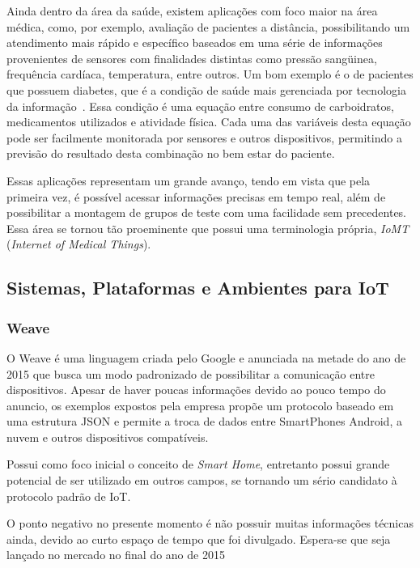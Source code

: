 Ainda dentro da área da saúde, existem aplicações com foco maior na área médica, como, por exemplo,
avaliação de pacientes a distância, possibilitando um atendimento mais rápido e específico baseados em uma
série de informações provenientes de sensores com finalidades distintas como pressão sangüinea,
frequência cardíaca, temperatura, entre outros. Um bom exemplo é o de pacientes que possuem
diabetes, que é a condição de saúde mais gerenciada por tecnologia da informação~\cite{mcgrath2013sensor}.
Essa condição é uma equação entre consumo de carboidratos, medicamentos utilizados e atividade física.
Cada uma das variáveis desta equação pode ser facilmente monitorada por sensores e outros dispositivos,
permitindo a previsão do resultado desta combinação no bem estar do paciente.

Essas aplicações representam um grande avanço, tendo em vista que pela primeira vez, é possível
acessar informações precisas em tempo real, além de possibilitar a montagem de grupos de teste com
uma facilidade sem precedentes. Essa área se tornou tão proeminente que
possui uma terminologia própria, \textit{IoMT} (\textit{Internet of Medical Things}).


\subsection{Sistemas, Plataformas e Ambientes para IoT}
\label{sec:IoTPlataformas}

\subsubsection{Weave}
O Weave é uma linguagem criada pelo Google e anunciada na metade do ano de 2015 que busca um modo padronizado
de possibilitar a comunicação entre dispositivos. Apesar de haver poucas informações devido ao pouco tempo
do anuncio, os exemplos expostos pela empresa propõe um protocolo baseado em uma estrutura JSON e permite a troca
de dados entre SmartPhones Android, a nuvem e outros dispositivos compatíveis.

Possui como foco inicial o conceito de \textit{Smart Home}, entretanto possui grande potencial de
ser utilizado em outros campos, se tornando um sério candidato à protocolo padrão de IoT.

O ponto negativo no presente momento é não possuir muitas informações técnicas ainda, devido ao
curto espaço de tempo que foi divulgado. Espera-se que seja lançado no mercado no final do ano de
2015

